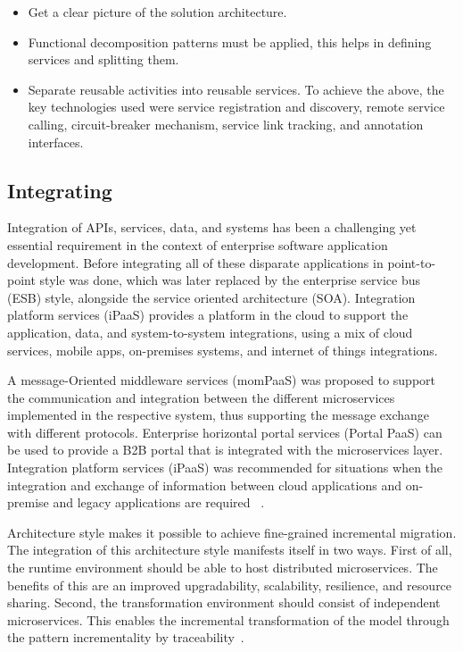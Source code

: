 \begin{itemize}
\item Get a clear picture of the solution architecture. 
\item Functional decomposition patterns must be applied, this helps in defining services and splitting them.
\item Separate reusable activities into reusable services.
To achieve the above, the key technologies used were service registration and discovery, remote service calling, circuit-breaker mechanism, service link tracking, and annotation interfaces.
\end{itemize}


\subsection{Integrating}%
Integration of APIs, services, data, and systems has been a challenging yet essential requirement in the context of enterprise software application development. Before integrating all of these disparate applications in point-to-point style was done, which was later replaced by the enterprise service bus (ESB) style, alongside the service oriented architecture (SOA).
Integration platform services (iPaaS) provides a platform in the cloud to support the application, data, and system-to-system integrations, using a mix of cloud services, mobile apps, on-premises systems, and internet of things integrations. 

\par A message-Oriented middleware services (momPaaS) was proposed to support the communication and integration between the different microservices implemented in the respective system, thus supporting the message exchange with different protocols.
Enterprise horizontal portal services (Portal PaaS) can be used to provide a B2B portal that is integrated with the microservices layer.
Integration platform services (iPaaS) was recommended for situations when the integration and exchange of information between cloud applications and on-premise and legacy applications are required ~\cite{rosa2018}.

\par Architecture style makes it possible to achieve fine-grained incremental migration. The integration of this architecture style manifests itself in two ways. First of all, the runtime environment should be able to host distributed microservices. The benefits of this are an improved upgradability, scalability, resilience, and resource sharing.
Second, the transformation environment should consist of independent microservices. This enables the incremental transformation of the model through the pattern incrementality by traceability~\cite{liu2018, overeem2018}.

